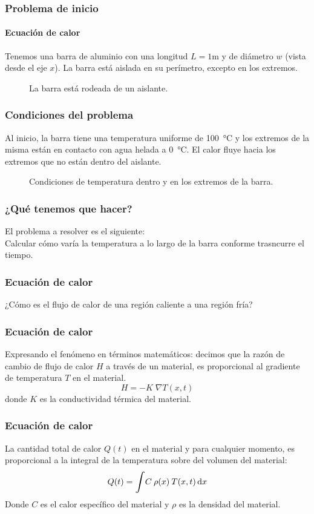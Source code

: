\documentclass[12pt]{beamer}
\begin{document}
\begin{frame}
\frametitle{Problema de inicio}
\framesubtitle{Ecuación de calor}
Tenemos una barra de aluminio con una longitud $L = 1 \si\meter$ y de diámetro $w$ (vista desde el eje $x$). La barra está aislada en su perímetro, excepto en los extremos.
\begin{figure}
	\centering
	
	\caption{La barra está rodeada de un aislante.}
\end{figure}
\end{frame}
\begin{frame}
\frametitle{Condiciones del problema}
Al inicio, la barra tiene una temperatura uniforme de \SI{100}{\degreeCelsius} y los extremos de la misma están en contacto con agua helada a \SI{0}{\degreeCelsius}. El calor fluye hacia los extremos que no están dentro del aislante.
\begin{figure}
	\centering
	
	\caption{Condiciones de temperatura dentro y en los extremos de la barra.}
\end{figure}
\end{frame}
\begin{frame}
\frametitle{¿Qué tenemos que hacer?}
El problema a resolver es el siguiente:
\\
\bigskip
Calcular cómo varía la temperatura a lo largo de la barra conforme trasncurre el tiempo.
\end{frame}
\begin{frame}
\frametitle{Ecuación de calor}
¿Cómo es el flujo de calor de una región caliente a una región fría?
\end{frame}
\begin{frame}
\frametitle{Ecuación de calor}
Expresando el fenómeno en términos matemáticos: decimos que la razón de cambio de flujo de calor $H$ a través de un material, es proporcional al gradiente de temperatura $T$ en el material.
\begin{equation}
H = -K \; \nabla T(x, t)
\label{eq:ecuacion_17_55}	
\end{equation}
donde $K$ es la conductividad térmica del material.
\end{frame}
\begin{frame}
\frametitle{Ecuación de calor}
La cantidad total de calor $Q(t)$ en el material y para cualquier momento, es proporcional a la  integral de la temperatura sobre del volumen del material:
\begin{equation}
Q(t) = \scaleint{6ex} C \: \rho(x) \: T (x, t) \dd{x}
\label{eq:ecuacion_17_56}
\end{equation}
Donde $C$ es el calor específico del material y $\rho$ es la densidad del material. 
\end{frame}
\end{document}
